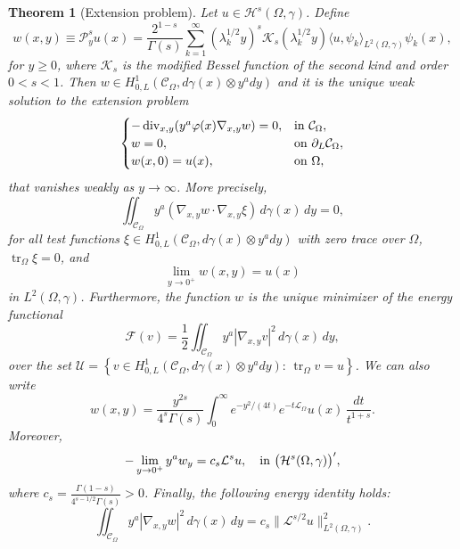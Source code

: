 \documentclass[a4paper,10pt,reqno]{amsart}
\newtheorem{theorem}{Theorem}[section]
\numberwithin{equation}{section}
\begin{document}
\begin{theorem}[Extension problem]\label{extensth}
Let $u\in\mathcal{H}^s(\Omega,\gamma)$. Define
\begin{equation}
w(x,y)\equiv\mathcal{P}_y^su(x)=
\frac{2^{1-s}}{\Gamma(s)}\sum_{k=1}^{\infty}(\lambda_k^{1/2}y)^s\mathcal{K}_s(\lambda_k^{1/2}y)
\langle u,\psi_{k}\rangle_{L^{2}(\Omega,\gamma)}\psi_{k}(x),
\label{trueextens}
\end{equation}
for $y\geq0$, where $\mathcal{K}_s$ is the modified Bessel function of the second kind and order $0<s<1$.
Then $w\in H_{0,L}^{1}(\mathcal{C}_{\Omega},d\gamma(x)\otimes y^ady)$ and it is the
unique weak solution to the extension problem
\begin{equation}
\begin{cases}
-\operatorname{div}_{x,y}(y^a\varphi(x)\nabla_{x,y}w)=0,&\hbox{in}~\mathcal{C}_{\Omega},\\
w=0, & \hbox{on}~\partial_{L}\mathcal{C}_{\Omega},\\
w(x,0)=u(x), & \hbox{on}~\Omega,
\end{cases}
\label{extensionproblem}%
\end{equation}
that vanishes weakly as $y\to\infty$. More precisely,
\[
\iint_{\mathcal{C}_{\Omega}}y^a(\nabla_{x,y}w\cdot\nabla_{x,y}\xi)\,d\gamma
(x)\,dy=0,
\]
for all test functions $\xi\in H_{0,L}^{1}(\mathcal{C}_{\Omega},d\gamma
(x)\otimes y^ady)$ with zero trace over $\Omega$, $\operatorname{tr}_{\Omega}%
\xi=0$, and
\[
\lim_{y\rightarrow0^{+}}w(x,y)=u(x)
\]
in $L^{2}(\Omega,\gamma)$. Furthermore, the function $w$ is the unique
minimizer of the energy functional
\begin{equation}
\mathcal{F}(v)=\frac{1}{2}\iint_{\mathcal{C}_{\Omega}}y^a|\nabla_{x,y}%
v|^{2}\,d\gamma(x)\,dy, \label{energufunct}%
\end{equation}
over the set $\mathcal{U}=\left\{  v\in H_{0,L}^{1}(\mathcal{C}_{\Omega
},d\gamma(x)\otimes y^ady):\,\operatorname{tr}_{\Omega}v=u\right\}  $.
We can also write
\begin{equation}
w(x,y)=\frac{y^{2s}}{4^s\Gamma(s)}\int_{0}^{\infty}e^{-y^{2}/(4t)}
e^{-t\mathcal{L}_{\Omega}}u(x)\,\frac{dt}{t^{1+s}}.\label{StingaTorreasemigr}
\end{equation}
Moreover,
$$-\lim_{y\rightarrow0^{+}}y^aw_{y}=c_s\mathcal{L}^su,\quad\hbox{in}~\big(\mathcal{H}^s
(\Omega,\gamma)\big)^{\prime},$$
where $c_s=\frac{\Gamma(1-s)}{4^{s-1/2}\Gamma(s)}>0$. Finally, the following energy identity holds:
\begin{equation}\label{importidentity}
\iint_{\mathcal{C}_{\Omega}}y^a|\nabla_{x,y}w|^{2}\,d\gamma(x)\,dy=
c_s\|\mathcal{L}^{s/2}u\|^{2}_{L^{2}(\Omega,\gamma)}.
\end{equation}
\end{theorem}
\end{document}
